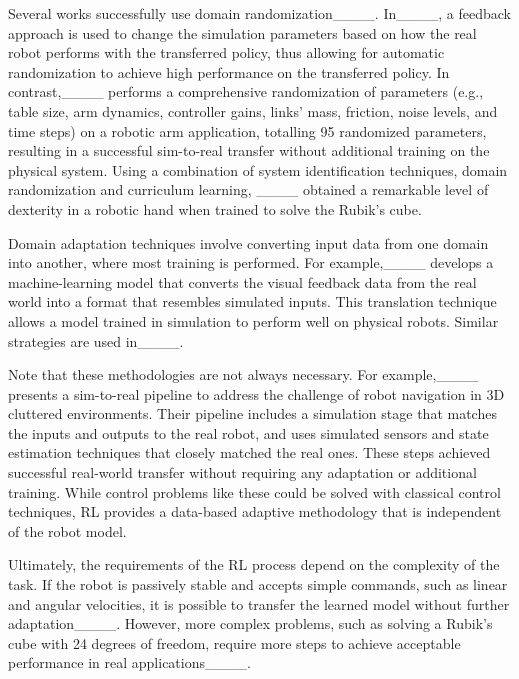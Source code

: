 Several works successfully use domain randomization____. In____, a feedback approach is used to change the simulation parameters based on how the real robot performs with the transferred policy, thus allowing for automatic randomization to achieve high performance on the transferred policy. In contrast,____ performs a comprehensive randomization of parameters (e.g., table size, arm dynamics, controller gains, links' mass, friction, noise levels, and time steps) on a robotic arm application, %
totalling 95 randomized parameters, resulting in a successful sim-to-real transfer without additional training on the physical system. Using a combination of system identification techniques, domain randomization and curriculum learning, ____ obtained a remarkable level of dexterity in a robotic hand when trained to solve the Rubik's cube.


Domain adaptation techniques involve converting input data from one domain into another, where most training is performed. For example,____ develops a machine-learning model that converts the visual feedback data from the real world into a format that resembles simulated inputs. This translation technique allows a model trained in simulation to perform well on physical robots. Similar strategies are used in____.

Note that these methodologies are not always necessary. For example,____ presents a sim-to-real pipeline to address the challenge of robot navigation in 3D cluttered environments. Their pipeline includes a simulation stage that matches the inputs and outputs to the real robot, and uses simulated sensors and state estimation techniques that closely matched the real ones. These steps achieved successful real-world transfer without requiring any adaptation or additional training. While control problems like these could be solved with classical control techniques, RL provides a data-based adaptive methodology that is independent of the robot model.

Ultimately, the requirements of the RL process depend on the complexity of the task. If the robot is passively stable and accepts simple commands, such as linear and angular velocities, it is possible to transfer the learned model without further adaptation____. However, more complex problems, such as solving a Rubik's cube with 24 degrees of freedom, require more steps to achieve acceptable performance in real applications____. %